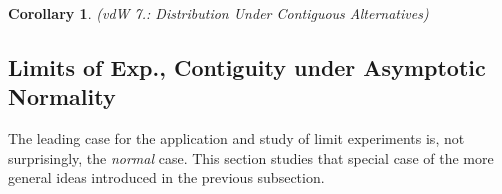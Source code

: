 \documentclass[12pt]{article}
\theoremstyle{plain}
\newtheorem{cor}[thm]{Corollary}
\theoremstyle{definition}
\theoremstyle{remark}
\begin{document}
\begin{cor}\emph{(vdW 7.: Distribution Under Contiguous Alternatives)}
\end{cor}





\clearpage
\subsection{Limits of Exp., Contiguity under Asymptotic Normality}

The leading case for the application and study of limit experiments is,
not surprisingly, the \emph{normal} case.
This section studies that special case of the more general ideas
introduced in the previous subsection.

\begin{comment}
- Replace $I_\theta$ with $J$
- Note that we can always rescale
- Add limiting distribution of log LR ratio
- Inspect sufficient condition
\end{comment}
\end{document}
